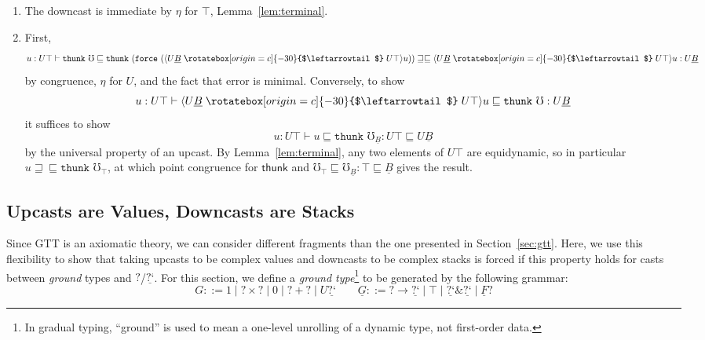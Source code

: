 \documentclass[acmsmall,screen,12pt]{acmart}
\renewcommand{\u}{\underline}
\newcommand{\ltdyn}{\sqsubseteq}
\newcommand{\gtdyn}{\sqsupseteq}
\newcommand{\equidyn}{\mathrel{\gtdyn\ltdyn}}
\newcommand{\dynv}{{?}}
\newcommand{\dync}{\u {\text{?`}}}
\newcommand{\uarrow}{\mathrel{\rotatebox[origin=c]{-30}{$\leftarrowtail$}}}
\newcommand{\upcast}[2]{\langle{#2}\uarrow{#1}\rangle}
\newcommand{\err}{\mho}
\newcommand{\kw}[1]{\texttt{#1}\,\,}
\newcommand{\thunk}{\kw{thunk}}
\newcommand{\force}{\kw{force}}
\newcommand{\with}{\mathbin{\&}}
\begin{document}
\begin{longonly}
\begin{longproof}
\begin{enumerate}
  \item The downcast is immediate by $\eta$ for $\top$,
    Lemma~\ref{lem:terminal}.  

  \item First,
    \[
    u : U \top \vdash \thunk \err \ltdyn \thunk{(\force{(\upcast{U \top}{U \u B}{u})})} \equidyn {\upcast{U \top}{U \u B}{u}} : U \u B
    \]
    by congruence, $\eta$ for $U$, and the fact that error is minimal.
    Conversely, to show
    \[
    u : U \top \vdash {\upcast{U \top}{U \u B}{u}} \ltdyn \thunk \err  : U \u B
    \]
    it suffices to show
    \[
    u : U \top \vdash u \ltdyn \thunk \err_{\u B}  : U \top \ltdyn U \u B
    \]
    by the universal property of an upcast.  By Lemma~\ref{lem:terminal},
    any two elements of $U \top$ are equidynamic, so in particular $u
    \equidyn \thunk{\err_{\top}}$, at which point congruence for
    $\mathsf{thunk}$ and $\err_\top \ltdyn \err_{\u B } : \top \ltdyn \u
    B$ gives the result.
  \end{enumerate}
\end{longproof}
\end{longonly}

\subsection{Upcasts are Values, Downcasts are Stacks}
\label{sec:upcasts-necessarily-values}

Since GTT is an axiomatic theory, we can consider different fragments
than the one presented in Section~\ref{sec:gtt}.  Here, we use this
flexibility to show that taking upcasts to be complex values and
downcasts to be complex stacks is forced if this property holds for
casts between \emph{ground} types and $\dynv$/$\dync$.  For this section, we define a \emph{ground
  type}\footnote{In gradual
  typing, ``ground'' is used to mean a one-level unrolling of a dynamic type, not first-order data.} to be generated by the following grammar:
  \[
    G ::= 1 \mid \dynv \times \dynv \mid 0 \mid \dynv + \dynv \mid U \dync
    \qquad
    \u G ::= \dynv \to \dync \mid \top \mid \dync \with \dync \mid \u F \dynv
  \]
\end{document}
